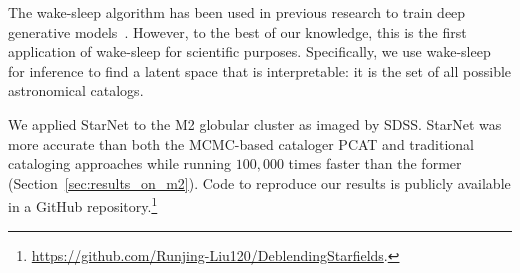 The wake-sleep algorithm has been used in previous research to train deep generative models~\citep{Hinton1995wake_sleep, bornschein2014reweighted, le2020revisiting}.
However, to the best of our knowledge, this is the first application of wake-sleep for scientific purposes. 
Specifically, we use wake-sleep for inference to find a latent space that is interpretable: it is the set of all possible astronomical catalogs.


We applied StarNet to the M2 globular cluster as imaged by SDSS.
StarNet was more accurate than both the MCMC-based cataloger PCAT and traditional cataloging approaches while running $100,000$ times faster than the former (Section~\ref{sec:results_on_m2}).
Code to reproduce our results is publicly available in a GitHub repository.\footnote{
\url{https://github.com/Runjing-Liu120/DeblendingStarfields}. 
} 



















